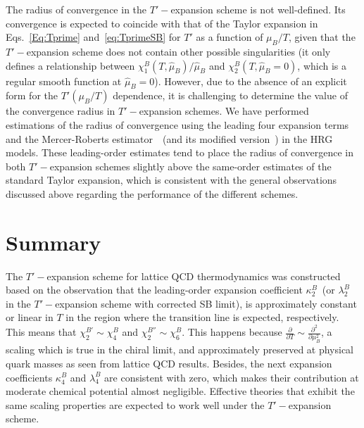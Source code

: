 \documentclass[%
 reprint,
nofootinbib,
 amsmath,amssymb,
 aps,
prc
]{revtex4-2}
\begin{document}
The radius of convergence in the $T'-$expansion scheme is not well-defined. Its convergence is expected to coincide with that of the Taylor expansion in Eqs.~\eqref{Eq:Tprime} and~\eqref{eq:TprimeSB} for $T'$ as a function of $\mu_B/T$, given that the $T'-$expansion scheme does not contain other possible singularities (it only defines a relationship between $\chi_1^B(T,\hat{\mu}_B)/{\hat{\mu}_B}$ and $\chi_2^B(T,\hat{\mu}_B = 0)$, which is a regular smooth function at $\hat{\mu}_B = 0$).
However, due to the absence of an explicit form for the $T'(\mu_B/T)$ dependence, it is challenging to determine the value of the convergence radius in $T'-$expansion schemes.
We have performed estimations of the radius of convergence using the leading four expansion terms and the Mercer-Roberts estimator~\cite{mercer1990centre}~(and its modified version~\cite{Giordano:2019slo}) in the HRG models.
These leading-order estimates tend to place the radius of convergence in both $T'-$expansion schemes slightly above the same-order estimates of the standard Taylor expansion, which is consistent with the general observations discussed above regarding the performance of the different schemes.



\section{\label{Summary}{Summary}}

The $T'-$expansion scheme for lattice QCD thermodynamics was constructed based on the observation that 
the leading-order expansion coefficient $\kappa_2^B$~(or $\lambda_2^B$ in the $T'-$expansion scheme with corrected SB limit), 
is approximately constant or linear in $T$ in the region where the transition line is expected, respectively. 
This means that $ \chi_2^{B'} \sim \chi_4^B $ and  $\chi_2^{B''} \sim \chi_6^B $.  
This happens because $\frac{\partial }{ \partial T} \sim \frac{\partial^2}{ \partial \mu_B^2}$, a scaling which is true in the chiral limit, and 
 approximately preserved at physical quark masses
as seen from lattice QCD results. 
Besides, the next expansion coefficients $\kappa_4^B$ and $\lambda_4^B$ are consistent with zero, which makes their contribution at moderate chemical potential almost negligible.
Effective theories that exhibit the same scaling properties are expected to work well under the $T'-$expansion scheme.
\end{document}
